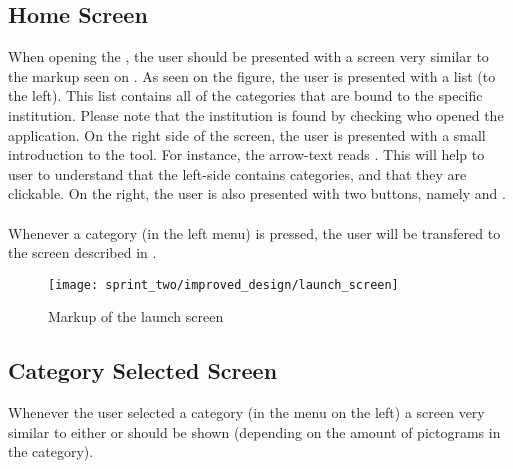 
\subsection{Home Screen}
\label{sec:home_screen}
When opening the \ct, the user should be presented with a screen very similar to the markup seen on . As seen on the figure, the user is presented with a list (to the left). This list contains all of the categories that are bound to the specific institution. Please note that the institution is found by checking who opened the application. On the right side of the screen, the user is presented with a small introduction to the tool. For instance, the arrow-text reads . This will help to user to understand that the left-side contains categories, and that they are clickable. On the right, the user is also presented with two buttons, namely  and .
\\\\
Whenever a category (in the left menu) is pressed, the user will be transfered to the screen described in .

\begin{figure}[!htbp]
    \centering
    \texttt{[image: sprint\_two/improved\_design/launch\_screen]}
    \caption{Markup of the launch screen}
    \label{fig:improved_design_launch_screen}
\end{figure}

\subsection{Category Selected Screen}
\label{sec:category_selected_screen}
Whenever the user selected a category (in the menu on the left) a screen very similar to either  or  should be shown (depending on the amount of pictograms in the category).\\

